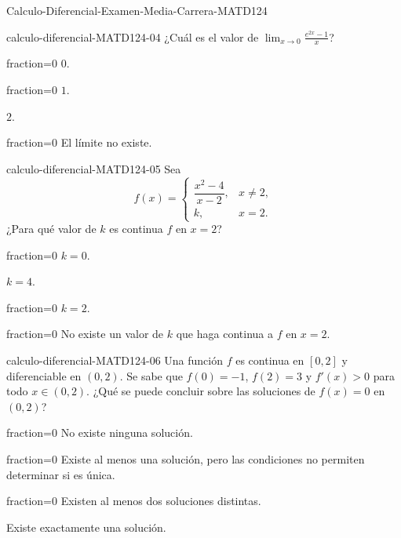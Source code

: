 \documentclass[10pt]{article}
\begin{document}
\begin{quiz}{Calculo-Diferencial-Examen-Media-Carrera-MATD124}

\begin{multi}[single=true,shuffle=false]{calculo-diferencial-MATD124-04}
¿Cuál es el valor de
$\displaystyle\lim_{x\to 0}\frac{e^{2x}-1}{x}$?
    \item[fraction=0] $0$.
    \item[fraction=0] $1$.
    \item* $2$.
    \item[fraction=0] El límite no existe.
\end{multi}


\begin{multi}[single=true,shuffle=false]{calculo-diferencial-MATD124-05}
Sea
$$
f(x)=\begin{cases}
\dfrac{x^2-4}{x-2},&x\neq 2,\\
k,&x=2.
\end{cases}
$$
¿Para qué valor de $k$ es continua $f$ en $x=2$?
    \item[fraction=0] $k=0$.
    \item* $k=4$.
    \item[fraction=0] $k=2$.
    \item[fraction=0] No existe un valor de $k$ que haga continua a $f$ en $x=2$.
\end{multi}


\begin{multi}[single=true,shuffle=false]{calculo-diferencial-MATD124-06}
Una función $f$ es continua en $[0,2]$ y diferenciable en $(0,2)$.
Se sabe que $f(0)=-1$, $f(2)=3$ y $f'(x)>0$ para todo $x\in(0,2)$.
¿Qué se puede concluir sobre las soluciones de $f(x)=0$ en $(0,2)$?
    \item[fraction=0] No existe ninguna solución.
    \item[fraction=0] Existe al menos una solución, pero las condiciones
    no permiten determinar si es única.
    \item[fraction=0] Existen al menos dos soluciones distintas.
    \item* Existe exactamente una solución.
\end{multi}



\end{quiz}
\end{document}
